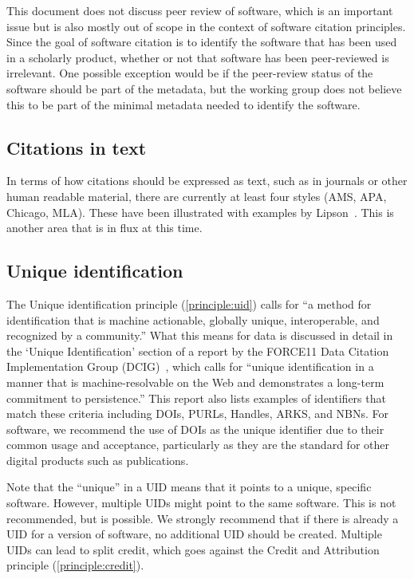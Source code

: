 \documentclass[11pt, oneside]{amsart}
\begin{document}
This document does not discuss peer review of software, which is an important issue but is
also mostly out of scope in the context of software citation principles.
Since the goal of software citation is to identify the software
that has been used in a scholarly product, whether or not that software has been peer-reviewed
is irrelevant.  One possible exception would be if the peer-review status of the software should
be part of the metadata, but the working group does not believe this to be part of the
minimal metadata needed to identify the software.

\subsection{Citations in text}

In terms of how citations should be expressed as text, such
as in journals or other human readable material, there are currently at least four styles (AMS, APA, Chicago, MLA). These have been illustrated with examples by Lipson~\cite{lipson2011cite}.
This is another area that is in flux at this time.

\subsection{Unique identification}

The Unique identification principle (\ref{principle:uid}) calls for ``a method for identification that is machine actionable, globally unique, interoperable, and recognized by a community.''
What this means for data is discussed in detail in the `Unique Identification' section of a report by the FORCE11 Data Citation Implementation Group (DCIG)~\cite{10.7717/peerj-cs.1}, which calls for ``unique identification in a manner that is machine-resolvable on the Web and demonstrates a long-term commitment to persistence.''
This report also lists examples of identifiers that match these criteria including DOIs, PURLs, Handles, ARKS, and NBNs.
For software, we recommend the use of DOIs as the unique identifier due to their common usage and acceptance, particularly as they are the standard for other digital products such as publications.

Note that the ``unique'' in a UID means that it points to a unique, specific software. However, multiple UIDs might point to the same software.
This is not recommended, but is possible.
We strongly recommend that if there is already a UID for a version of software, no additional UID should be created.
Multiple UIDs can lead to split credit, which goes against the Credit and Attribution principle (\ref{principle:credit}).
\end{document}
